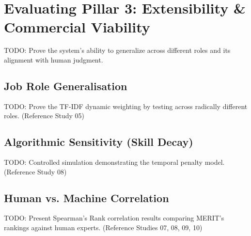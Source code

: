 \section{Evaluating Pillar 3: Extensibility \& Commercial Viability}

TODO: Prove the system's ability to generalize across different roles and its alignment with human judgment.

\subsection{Job Role Generalisation}
TODO: Prove the TF-IDF dynamic weighting by testing across radically different roles. (Reference Study 05)

\subsection{Algorithmic Sensitivity (Skill Decay)}
TODO: Controlled simulation demonstrating the temporal penalty model. (Reference Study 08)

\subsection{Human vs. Machine Correlation}
TODO: Present Spearman's Rank correlation results comparing MERIT's rankings against human experts. (Reference Studies 07, 08, 09, 10)
